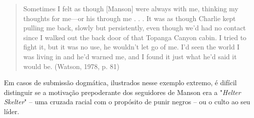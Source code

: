 \documentclass[
12pt,				%
openright,			%
twoside,			%
a4paper,			%
english,			%
french,				%
spanish,			%
brazil				%
]{abntex2}
\begin{document}
\begin{quote}
	Sometimes I felt as though [Manson] were always with me, thinking my thoughts for me—or his through me . . . It was as though Charlie kept pulling me back, slowly but persistently, even though we’d had no contact since I walked out the back door of that Topanga Canyon cabin. I tried to fight it, but it was no use, he wouldn’t let go of me. I’d seen the world I was living in and he’d warned me, and I found it just what he’d said it would be. (Watson, 1978, p. 81)
\end{quote}

Em casos de submissão dogmática, ilustrados nesse exemplo extremo, é difícil distinguir se a motivação prepoderante dos seguidores de Manson era a "\emph{Helter Skelter}" -- uma cruzada racial com o propósito de punir negros -- ou o culto ao seu líder.
\end{document}
